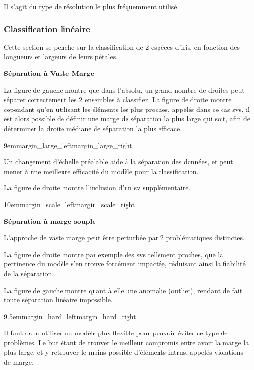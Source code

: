 Il s’agit du type de résolution le plus fréquemment utilisé.

\subsubsection{Classification linéaire}

Cette section se penche sur la classification de 2 espèces d’iris,
en fonction des longueurs et largeurs de leurs pétales.

\textbf{Séparation à Vaste Marge}

La figure de gauche montre que dans l’absolu, un grand nombre de droites
peut séparer correctement les 2 ensembles à classifier.
La figure de droite montre cependant qu’en utilisant les éléments
les plus proches, appelés dans ce cas \glspl{sv}, il est alors possible
de définir une marge de séparation la plus large qui soit, afin de
déterminer la droite médiane de séparation la plus efficace.

{9em}{margin_large_left}{margin_large_right}

Un changement d’échelle préalable aide à la séparation des données,
et peut mener à une meilleure efficacité du modèle pour la classification.
\cite{scaling}

La figure de droite montre l’inclusion d’un \gls{sv} supplémentaire.

{10em}{margin_scale_left}{margin_scale_right}

\pagebreak

\textbf{Séparation à marge souple}

L’approche de vaste marge peut être perturbée par 2 problématiques distinctes.

La figure de droite montre par exemple des \glspl{sv} tellement proches,
que la pertinence du modèle s’en trouve forcément impactée, réduisant
ainsi la fiabilité de la séparation.

La figure de gauche montre quant à elle une anomalie (outlier),
rendant de fait toute séparation linéaire impossible.

{9.5em}{margin_hard_left}{margin_hard_right}

Il faut donc utiliser un modèle plus flexible pour pouvoir éviter
ce type de problèmes. Le but étant de trouver le meilleur compromis
entre avoir la marge la plus large, et y retrouver le moins possible
d’éléments intrus, appelés violations de marge.

